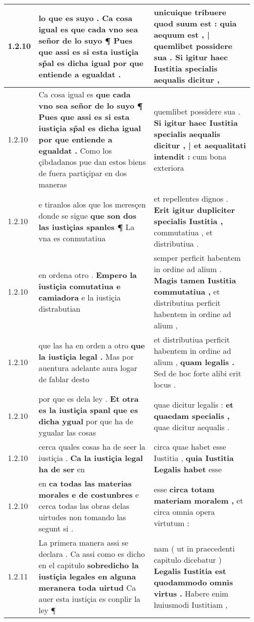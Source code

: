 \begin{tabular}{|p{1cm}|p{6.5cm}|p{6.5cm}|}
1.2.10 & lo que es suyo . \textbf{ Ca cosa igual es } que cada vno sea señor de lo suyo ¶ Pues que assi es si esta iustiçia sp̃al es dicha igual por que entiende a egualdat . & unicuique tribuere quod suum est : \textbf{ quia aequum est , | quemlibet possidere sua . } Si igitur haec Iustitia specialis aequalis dicitur , \\\hline
1.2.10 & Ca cosa igual es \textbf{ que cada vno sea señor de lo suyo ¶ Pues que assi es si esta iustiçia sp̃al es dicha igual por que entiende a egualdat . } Como los çibdadanos pue dan estos biens de fuera partiçipar en dos maneras & quemlibet possidere sua . \textbf{ Si igitur haec Iustitia specialis aequalis dicitur , | et aequalitati intendit : } cum bona exteriora \\\hline
1.2.10 & e tiranlos alos que los meresçen donde se sigue \textbf{ que son dos las iustiçias spanles ¶ } La vna es conmutatiua & et repellentes dignos . \textbf{ Erit igitur dupliciter specialis Iustitia , } commutatiua , et distributiua . \\\hline
1.2.10 & en ordena otro . \textbf{ Empero la iustiçia comutatiua e camiadora } e la iustiçia distrabutian & semper perficit habentem in ordine ad alium . \textbf{ Magis tamen Iustitia commutatiua , } et distributiua perficit habentem in ordine ad alium , \\\hline
1.2.10 & que las ha en orden a otro \textbf{ que la iustiçia legal . } Mas por auentura adelante aura logar de fablar desto & et distributiua perficit habentem in ordine ad alium , \textbf{ quam legalis . } Sed de hoc forte alibi erit locus . \\\hline
1.2.10 & por que es dela ley . \textbf{ Et otra es la iustiçia spanl que es dicha ygual } por que ha de ygualar las cosas & quae dicitur legalis : \textbf{ et quaedam specialis , } quae dicitur aequalis . \\\hline
1.2.10 & cerca quales cosas ha de seer la iustiçia . \textbf{ Ca la iustiçia legal ha de ser } en & circa quae habet esse Iustitia , \textbf{ quia Iustitia Legalis habet } esse \\\hline
1.2.10 & en \textbf{ ca todas las materias morales e de costunbres } e cerca todas las obras delas uirtudes non tomando las segunt si . & esse \textbf{ circa totam materiam moralem , } et circa omnia opera virtutum : \\\hline
1.2.11 & La primera manera assi se declara . Ca assi como es dicho en el capitulo \textbf{ sobredicho la iustiçia legales en alguna meranera toda uirtud } Ca auer esta iustiçia es conplir la ley ¶ & nam ( ut in praecedenti capitulo dicebatur ) \textbf{ Legalis Iustitia est quodammodo omnis virtus . } Habere enim huiusmodi Iustitiam , \\\hline

\end{tabular}
